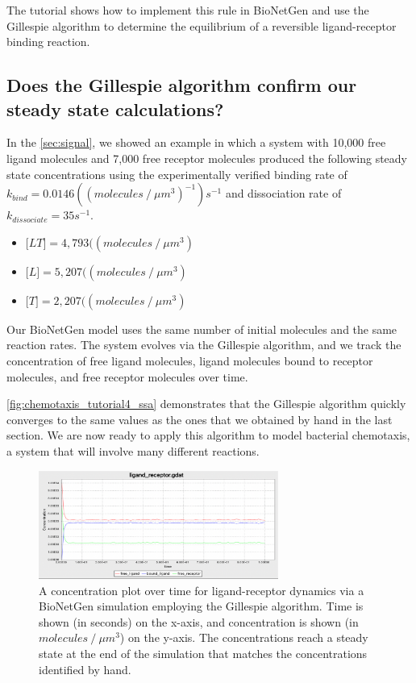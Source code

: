 The tutorial  shows how to implement this rule in BioNetGen and use the Gillespie algorithm to determine the equilibrium of a reversible ligand-receptor binding reaction.


\FloatBarrier
{}
\subsection{Does the Gillespie algorithm confirm our steady state calculations?}

In the \autoref{sec:signal}, we showed an example in which a system with 10,000 free ligand molecules and 7,000 free receptor molecules produced the following steady state concentrations using the experimentally verified binding rate of $k_{bind} = 0.0146 ((molecules\mathbin{/}\mu m^3)^{-1})s^{-1}$ and dissociation rate of $k_{dissociate} = 35s^{-1}$.

\begin{itemize}
\item $\text{[}LT\text{]} = 4,793 ((molecules\mathbin{/}\mu m^3)$
\item $\text{[}L\text{]} = 5,207 ((molecules\mathbin{/}\mu m^3)$
\item $\text{[}T\text{]} = 2,207 ((molecules\mathbin{/}\mu m^3)$
\end{itemize}

Our BioNetGen model uses the same number of initial molecules and the same reaction rates. The system evolves via the Gillespie algorithm, and we track the concentration of free ligand molecules, ligand molecules bound to receptor molecules, and free receptor molecules over time.

\autoref{fig:chemotaxis_tutorial4_ssa} demonstrates that the Gillespie algorithm quickly converges to the same values as the ones that we obtained by hand in the last section. We are now ready to apply this algorithm to model bacterial chemotaxis, a system that will involve many different reactions.

\begin{figure}[h]
\centering
\mySfFamily
\includegraphics[width = 0.7\textwidth]{../images/chemotaxis_tutorial4_ssa.png}
\caption{A concentration plot over time for ligand-receptor dynamics via a BioNetGen simulation employing the Gillespie algorithm. Time is shown (in seconds) on the x-axis, and concentration is shown (in $molecules\mathbin{/}\mu m^3$) on the y-axis. The concentrations reach a steady state at the end of the simulation that matches the concentrations identified by hand.}
\label{fig:chemotaxis_tutorial4_ssa}
\end{figure}

